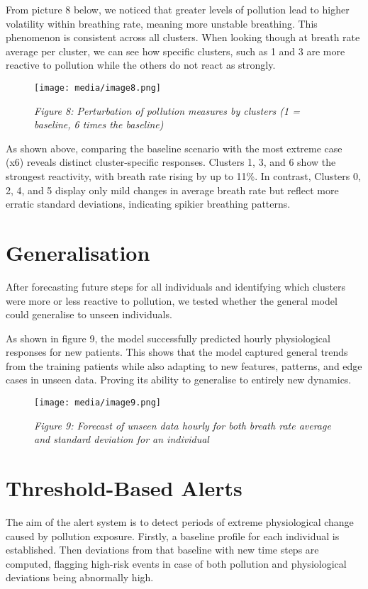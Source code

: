 \documentclass[12pt,a4paper]{report}
\begin{document}
From picture 8 below, we noticed that greater levels of pollution
lead to higher volatility within breathing rate, meaning more
unstable breathing. This phenomenon is consistent across all
clusters. When looking though at breath rate average per cluster, we can
see how specific clusters, such as 1 and 3 are more reactive to
pollution while the others do not react as strongly.

\begin{figure}[h!]
    \centering
    \texttt{[image: media/image8.png]}
    \caption*{\emph{Figure 8: Perturbation of pollution measures by clusters (1 = baseline, 6 times the baseline)}}
\end{figure}


As shown above, comparing the baseline scenario with the most extreme case (x6) reveals distinct
cluster-specific responses. Clusters 1, 3, and 6 show the strongest
reactivity, with breath rate rising by up to 11\%. In contrast, Clusters
0, 2, 4, and 5 display only mild changes in average breath rate but
reflect more erratic standard deviations, indicating spikier breathing
patterns.

\section{Generalisation}
After forecasting future steps for all individuals and identifying which
clusters were more or less reactive to pollution, we tested whether the
general model could generalise to unseen individuals.

As shown in figure 9, the model successfully predicted hourly
physiological responses for new patients. This shows that the model
captured general trends from the training patients while also adapting
to new features, patterns, and edge cases in unseen data. Proving its
ability to generalise to entirely new dynamics.


\begin{figure}[h!]
    \centering
    \texttt{[image: media/image9.png]}
    \caption*{\emph{Figure 9: Forecast of unseen data hourly for both breath rate
average and standard deviation for an individual}}

\end{figure}



\section{Threshold-Based Alerts}
The aim of the alert system is to detect periods of extreme physiological change
caused by pollution exposure. Firstly, a baseline profile for each individual is established. Then deviations from that
baseline with new time steps are computed, flagging high-risk events in case of both pollution and physiological deviations being abnormally high.
\end{document}
